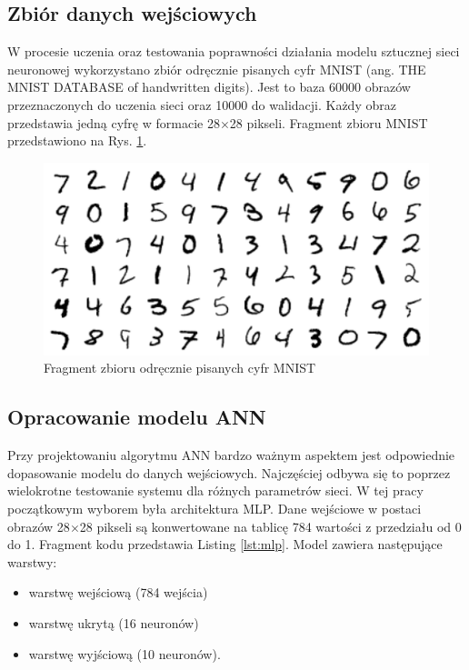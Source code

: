 \subsection{Zbiór danych wejściowych}

W procesie uczenia oraz testowania poprawności działania modelu sztucznej 
sieci neuronowej wykorzystano zbiór odręcznie pisanych cyfr MNIST 
(ang. THE MNIST DATABASE of handwritten digits)\cite{lecun-mnisthandwrittendigit-2010}. Jest to baza 60000 obrazów przeznaczonych do uczenia sieci oraz 10000 do walidacji. Każdy obraz przedstawia jedną cyfrę w formacie 28$\times$28 pikseli. 
Fragment zbioru MNIST przedstawiono na Rys. \ref{mnist-set}.

\begin{figure}[!h]
  \centering
  \includegraphics[width=\textwidth]{img/mnist.png}
  \caption{Fragment zbioru odręcznie pisanych cyfr MNIST \cite{lecun-mnisthandwrittendigit-2010}}
  \label{mnist-set}
\end{figure}

\subsection{Opracowanie modelu ANN}

Przy projektowaniu algorytmu ANN bardzo ważnym aspektem jest odpowiednie dopasowanie modelu do danych wejściowych. 
Najczęściej odbywa się to poprzez wielokrotne testowanie systemu dla różnych parametrów sieci. W tej pracy początkowym 
wyborem była architektura MLP. Dane wejściowe w postaci obrazów 28$\times$28 pikseli są konwertowane na tablicę 784 wartości z przedziału od 0 do 1. Fragment kodu przedstawia Listing \ref{lst:mlp}. Model zawiera następujące warstwy:
\begin{itemize}
  \item warstwę wejściową (784 wejścia)
  \item warstwę ukrytą (16 neuronów)
  \item warstwę wyjściową (10 neuronów).
\end{itemize}

